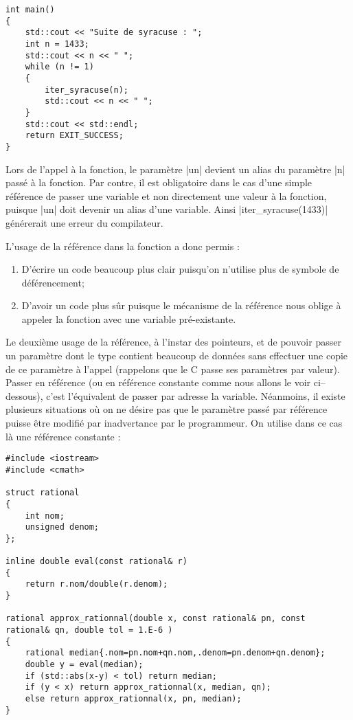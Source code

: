 \begin{itemize}
\begin{lstlisting}[caption=fonction C avec modification des arguments d'entrée]
int main()
{
    std::cout << "Suite de syracuse : ";
    int n = 1433;
    std::cout << n << " ";
    while (n != 1)
    {
        iter_syracuse(n);
        std::cout << n << " ";
    }
    std::cout << std::endl;
    return EXIT_SUCCESS;
}
\end{lstlisting}

Lors de l'appel à la fonction, le paramètre |un| devient un alias du paramètre |n| passé à la fonction. Par contre, il est obligatoire dans le cas d'une simple référence de passer une variable et non directement une valeur à la fonction, puisque
|un| doit devenir un alias d'une variable. Ainsi |iter_syracuse(1433)| générerait une erreur du compilateur.

L'usage de la référence dans la fonction a donc permis :
\begin{enumerate}
    \item D'écrire un code beaucoup plus clair puisqu'on n'utilise plus de symbole de déférencement;
    \item D'avoir un code plus sûr puisque le mécanisme de la référence nous oblige à appeler la fonction avec une variable
    pré-existante.
\end{enumerate}

Le deuxième usage de la référence, à l'instar des pointeurs, et de pouvoir passer un paramètre dont le type contient beaucoup
de données sans effectuer une copie de ce paramètre à l'appel (rappelons que le C passe ses paramètres par valeur). 
Passer en référence (ou en référence constante comme nous allons le voir ci--dessous), c'est l'équivalent de passer par adresse la variable. Néanmoins, il existe plusieurs situations où on ne désire pas que le paramètre passé par référence puisse être modifié par inadvertance par le programmeur. On utilise dans ce cas là une référence constante :

\begin{lstlisting}[caption=Exemple d'utilisation de la référence constante]
#include <iostream>
#include <cmath>

struct rational
{
    int nom;
    unsigned denom;
};

inline double eval(const rational& r)
{
    return r.nom/double(r.denom);
}

rational approx_rationnal(double x, const rational& pn, const rational& qn, double tol = 1.E-6 )
{
    rational median{.nom=pn.nom+qn.nom,.denom=pn.denom+qn.denom};
    double y = eval(median);
    if (std::abs(x-y) < tol) return median;
    if (y < x) return approx_rationnal(x, median, qn);
    else return approx_rationnal(x, pn, median);
}


\end{lstlisting}
\end{itemize}
